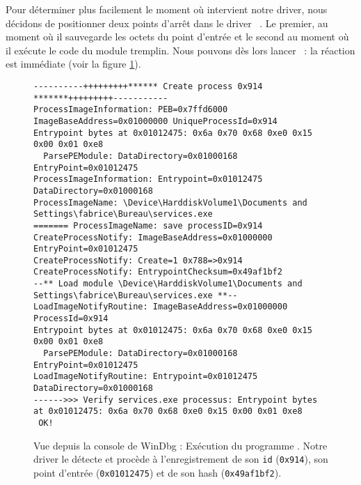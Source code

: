 Pour déterminer plus facilement le moment où intervient notre driver, nous décidons de positionner deux points d'arrêt dans le driver \Duqu\ . Le premier, au moment où il sauvegarde les octets du point d'entrée et le second au moment où il exécute le code du module tremplin. Nous pouvons dès lors lancer \service\ : la réaction est immédiate (voir la figure \ref{fig:AThierry_Breakpoint1}).  

\begin{figure}
\scriptsize
\begin{changemargin}{-1cm}{-1cm}
\begin{lstlisting}[language={}]
----------+++++++++****** Create process 0x914 *******+++++++++-----------
ProcessImageInformation: PEB=0x7ffd6000 ImageBaseAddress=0x01000000 UniqueProcessId=0x914 
Entrypoint bytes at 0x01012475: 0x6a 0x70 0x68 0xe0 0x15 0x00 0x01 0xe8
  ParsePEModule: DataDirectory=0x01000168 EntryPoint=0x01012475
ProcessImageInformation: Entrypoint=0x01012475 DataDirectory=0x01000168 
ProcessImageName: \Device\HarddiskVolume1\Documents and Settings\fabrice\Bureau\services.exe
======= ProcessImageName: save processID=0x914
CreateProcessNotify: ImageBaseAddress=0x01000000 EntryPoint=0x01012475 
CreateProcessNotify: Create=1 0x788=>0x914
CreateProcessNotify: EntrypointChecksum=0x49af1bf2
--** Load module \Device\HarddiskVolume1\Documents and Settings\fabrice\Bureau\services.exe **--
LoadImageNotifyRoutine: ImageBaseAddress=0x01000000 ProcessId=0x914 
Entrypoint bytes at 0x01012475: 0x6a 0x70 0x68 0xe0 0x15 0x00 0x01 0xe8
  ParsePEModule: DataDirectory=0x01000168 EntryPoint=0x01012475
LoadImageNotifyRoutine: Entrypoint=0x01012475 DataDirectory=0x01000168 
------>>> Verify services.exe processus: Entrypoint bytes at 0x01012475: 0x6a 0x70 0x68 0xe0 0x15 0x00 0x01 0xe8
 OK! 
\end{lstlisting}
\end{changemargin}
\caption{Vue depuis la console de WinDbg : Exécution du programme \texttt{\service}. Notre driver le détecte et procède à l'enregistrement de son \texttt{id} (\texttt{0x914}), son point d'entrée (\texttt{0x01012475}) et de son hash (\texttt{0x49af1bf2}).\label{fig:AThierry_Breakpoint1}}
\end{figure}

